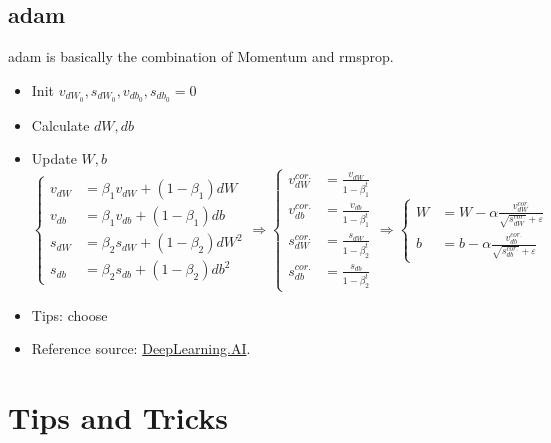 \subsection{\ac{adam}}
\ac{adam} is basically the combination of Momentum and \ac{rmsprop}.
\begin{itemize}
	\item Init $v_{dW_0}, s_{dW_0}, v_{db_0}, s_{db_0}=0$
	\item Calculate $dW, db$
	\item Update $W, b$
	\begin{equation}
		\begin{cases}
			v_{dW} &= \beta_1 v_{dW} + (1-\beta_1)dW \\
			v_{db} &= \beta_1 v_{db} + (1-\beta_1)db \\
			s_{dW} &= \beta_2 s_{dW} + (1-\beta_2)dW^2 \\
			s_{db} &= \beta_2 s_{db} + (1-\beta_2)db^2
		\end{cases}
		\Rightarrow
		\begin{cases}
			v^{cor.}_{dW} &= \frac{v_{dW}}{1 - \beta_1^t} \\
			v^{cor.}_{db} &= \frac{v_{db}}{1 - \beta_1^t} \\
			s^{cor.}_{dW} &= \frac{s_{dW}}{1 - \beta_2^t} \\
			s^{cor.}_{db} &= \frac{s_{db}}{1 - \beta_2^t}
		\end{cases}
		\Rightarrow
		\begin{cases}
			W &= W - \alpha \frac{v^{cor.}_{dW}}{\sqrt{s^{cor.}_{dW}} + \varepsilon}\\
			b &= b - \alpha \frac{v^{cor.}_{db}}{\sqrt{s^{cor.}_{db}} + \varepsilon}
		\end{cases}
	\end{equation}
	\item Tips: choose 
	\item Reference source: \href{https://youtu.be/JXQT_vxqwIs}{DeepLearning.AI}.
\end{itemize}

\section{Tips and Tricks}


